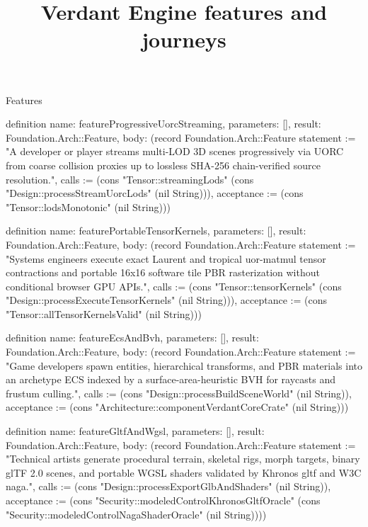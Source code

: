 \begin{lexlean}{Features}
\title{Verdant Engine features and journeys}
\begin{semanticmodule}
definition{
  name: featureProgressiveUorcStreaming,
  parameters: [],
  result: Foundation.Arch::Feature,
  body: (record Foundation.Arch::Feature {statement := "A developer or player streams multi-LOD 3D scenes progressively via UORC from coarse collision proxies up to lossless SHA-256 chain-verified source resolution.", calls := (cons "Tensor::streamingLods" (cons "Design::processStreamUorcLods" (nil String))), acceptance := (cons "Tensor::lodsMonotonic" (nil String))})
}

definition{
  name: featurePortableTensorKernels,
  parameters: [],
  result: Foundation.Arch::Feature,
  body: (record Foundation.Arch::Feature {statement := "Systems engineers execute exact Laurent and tropical uor-matmul tensor contractions and portable 16x16 software tile PBR rasterization without conditional browser GPU APIs.", calls := (cons "Tensor::tensorKernels" (cons "Design::processExecuteTensorKernels" (nil String))), acceptance := (cons "Tensor::allTensorKernelsValid" (nil String))})
}

definition{
  name: featureEcsAndBvh,
  parameters: [],
  result: Foundation.Arch::Feature,
  body: (record Foundation.Arch::Feature {statement := "Game developers spawn entities, hierarchical transforms, and PBR materials into an archetype ECS indexed by a surface-area-heuristic BVH for raycasts and frustum culling.", calls := (cons "Design::processBuildSceneWorld" (nil String)), acceptance := (cons "Architecture::componentVerdantCoreCrate" (nil String))})
}

definition{
  name: featureGltfAndWgsl,
  parameters: [],
  result: Foundation.Arch::Feature,
  body: (record Foundation.Arch::Feature {statement := "Technical artists generate procedural terrain, skeletal rigs, morph targets, binary glTF 2.0 scenes, and portable WGSL shaders validated by Khronos gltf and W3C naga.", calls := (cons "Design::processExportGlbAndShaders" (nil String)), acceptance := (cons "Security::modeledControlKhronosGltfOracle" (cons "Security::modeledControlNagaShaderOracle" (nil String)))})
}


\end{semanticmodule}
\end{lexlean}
